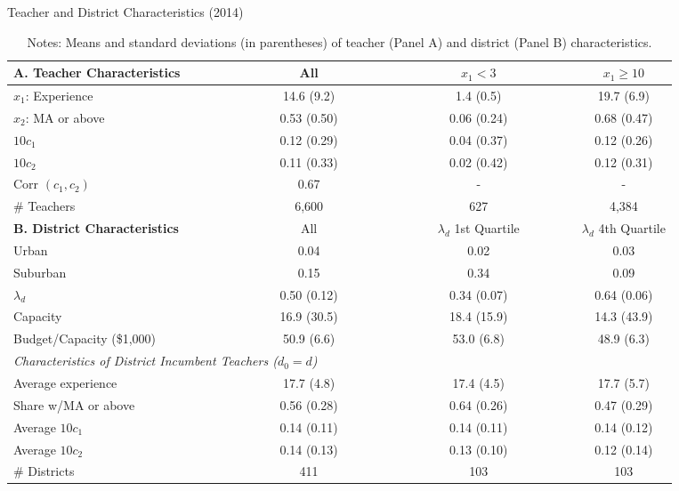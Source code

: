 \documentclass[notitlepage,12pt]{article}%
\begin{document}
\begin{table}[tbh]
\caption{Teacher and District Characteristics (2014)}
\centering\begin{tabular}
[c]{lcccccc}\hline\hline
\textbf{A. Teacher Characteristics} &  & All &  & $x_{1}<3$ &  & $x_{1}\geq10$\\\hline
$x_{1}$: Experience &  & 14.6 (9.2) &  & 1.4 (0.5)
&  & 19.7 (6.9)\\
$x_{2}$: MA or above &  & 0.53 (0.50) &  & 0.06
(0.24) &  & 0.68 (0.47)\\
$10c_{1}$ &  & 0.12 (0.29) &  & 0.04 (0.37) &  &
0.12 (0.26)\\
$10c_{2}$ &  & 0.11 (0.33) &  & 0.02 (0.42) &  &
0.12 (0.31)\\
Corr $(c_{1},c_{2})$ &  & 0.67 &  &
- &  & -\\
\# Teachers &  & 6,600 &  & 627 &  & 4,384\\\hline
\textbf{B. District Characteristics} &  & All &  & $\lambda_{d}$ 1st Quartile &  & $\lambda_{d}$ 4th Quartile\\\hline
Urban &  & 0.04 &  & 0.02 &  & 0.03\\
Suburban &  & 0.15 &  & 0.34 &  & 0.09\\
$\lambda_{d}$ &  & 0.50 (0.12) &  & 0.34 (0.07) &
& 0.64 (0.06)\\
Capacity &  & 16.9 (30.5) &  & 18.4 (15.9) &  &
14.3 (43.9)\\\vspace{0.2cm}
Budget/Capacity (\$1,000) &  & 50.9 (6.6) &  &
53.0 (6.8) &  & 48.9 (6.3)\\
\multicolumn{7}{l}{\emph{Characteristics of District Incumbent Teachers ($d_{0}=d$)}}\\
Average experience &  & 17.7 (4.8) &  & 17.4 (4.5)
&  & 17.7 (5.7)\\
Share w/MA or above &  & 0.56 (0.28) &  & 0.64
(0.26) &  & 0.47 (0.29)\\
Average $10c_{1}$ &  & 0.14 (0.11) &  & 0.14 (0.11)
&  & 0.14 (0.12)\\
Average $10c_{2}$ &  & 0.14 (0.13) &  & 0.13 (0.10)
&  & 0.12 (0.14)\\
\# Districts & \ \ \ \ \ \ \ \ \ \ \ \  & 411 &
\ \ \ \ \ \ \ \ \ \ \ \  & 103 & \ \ \ \ \ \  & 103\\\hline\hline
\end{tabular}
\caption*{{\footnotesize {Notes: Means and standard deviations (in
parentheses) of teacher (Panel A) and district (Panel B) characteristics.}}}
\vspace{-0.7cm}
\end{table}
\end{document}
